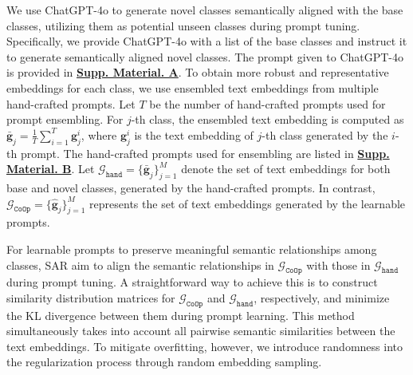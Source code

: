  We use ChatGPT-4o to generate novel classes semantically aligned with the base classes, utilizing them as potential unseen classes during prompt tuning. Specifically, we provide ChatGPT-4o with a list of the base classes and instruct it to generate semantically aligned novel classes. The prompt given to ChatGPT-4o is provided in \underline{\textbf{Supp. Material. A}}. To obtain more robust and representative embeddings for each class, we use ensembled text embeddings from multiple hand-crafted prompts. Let $T$ be the number of hand-crafted prompts used for prompt ensembling. For $j$-th class, the ensembled text embedding is computed as $\bar{\boldsymbol{g}}_j=\frac{1}{T}\sum_{i=1}^T \boldsymbol{g}_j^i$, where $\boldsymbol{g}_j^i$ is the text embedding of $j$-th class generated by the $i$-th prompt. The hand-crafted prompts used for ensembling are listed in \underline{\textbf{Supp. Material. B}}. Let $\mathcal{G}_{\mathtt{hand}}=\{\bar{\boldsymbol{g}}_j\}_{j=1}^{M}$ denote the set of text embeddings for both base and novel classes, generated by the hand-crafted prompts. In contrast, $\mathcal{G}_{\mathtt{CoOp}}=\{\hat{\boldsymbol{g}}_j\}_{j=1}^{M}$ represents the set of text embeddings generated by the learnable prompts.

For learnable prompts to preserve meaningful semantic relationships among classes, SAR aim to align the semantic relationships in $\mathcal{G}_{\mathtt{CoOp}}$ with those in $\mathcal{G}_{\mathtt{hand}}$ during prompt tuning.
A straightforward way to achieve this is to construct similarity distribution matrices for $\mathcal{G}_{\mathtt{CoOp}}$ and $\mathcal{G}_{\mathtt{hand}}$, respectively, and minimize the KL divergence \cite{kullback1951information} between them during prompt learning. This method simultaneously takes into account all pairwise semantic similarities between the text embeddings. To mitigate overfitting, however, we introduce randomness into the regularization process through random embedding sampling.

